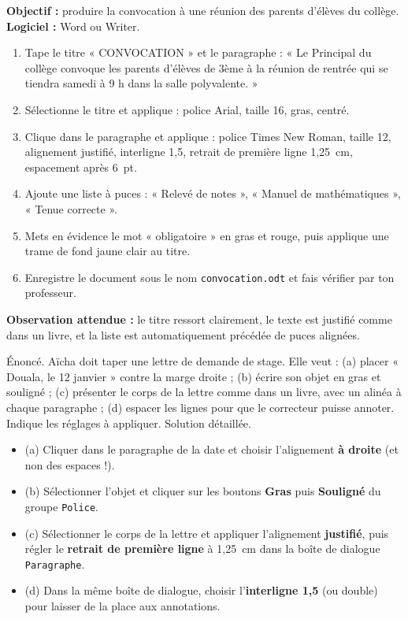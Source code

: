 \documentclass[11pt]{article}
\begin{document}
\begin{experience}
\textbf{Objectif :} produire la convocation à une réunion des parents d'élèves du collège. \textbf{Logiciel :} Word ou Writer.
\begin{enumerate}
\item Tape le titre « CONVOCATION » et le paragraphe : « Le Principal du collège convoque les parents d'élèves de 3ème à la réunion de rentrée qui se tiendra samedi à 9 h dans la salle polyvalente. »
\item Sélectionne le titre et applique : police Arial, taille 16, gras, centré.
\item Clique dans le paragraphe et applique : police Times New Roman, taille 12, alignement justifié, interligne 1,5, retrait de première ligne 1,25~cm, espacement après 6~pt.
\item Ajoute une liste à puces : « Relevé de notes », « Manuel de mathématiques », « Tenue correcte ».
\item Mets en évidence le mot « obligatoire » en gras et rouge, puis applique une trame de fond jaune clair au titre.
\item Enregistre le document sous le nom \texttt{convocation.odt} et fais vérifier par ton professeur.
\end{enumerate}
\textbf{Observation attendue :} le titre ressort clairement, le texte est justifié comme dans un livre, et la liste est automatiquement précédée de puces alignées.
\end{experience}

\begin{exoresolu}
Énoncé. Aïcha doit taper une lettre de demande de stage. Elle veut : (a) placer « Douala, le 12 janvier » contre la marge droite ; (b) écrire son objet en gras et souligné ; (c) présenter le corps de la lettre comme dans un livre, avec un alinéa à chaque paragraphe ; (d) espacer les lignes pour que le correcteur puisse annoter. Indique les réglages à appliquer.
\tcblower
Solution détaillée.
\begin{itemize}
\item (a) Cliquer dans le paragraphe de la date et choisir l'alignement \textbf{à droite} (et non des espaces !).
\item (b) Sélectionner l'objet et cliquer sur les boutons \textbf{Gras} puis \textbf{Souligné} du groupe \texttt{Police}.
\item (c) Sélectionner le corps de la lettre et appliquer l'alignement \textbf{justifié}, puis régler le \textbf{retrait de première ligne} à 1,25~cm dans la boîte de dialogue \texttt{Paragraphe}.
\item (d) Dans la même boîte de dialogue, choisir l'\textbf{interligne 1,5} (ou double) pour laisser de la place aux annotations.
\end{itemize}
\end{exoresolu}
\end{document}
